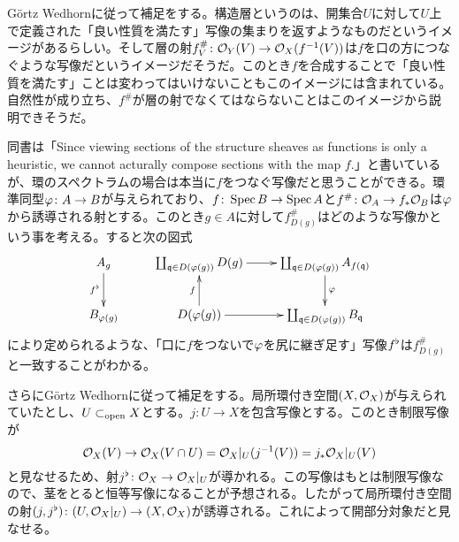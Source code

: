 \begin{rem}
  G\"{o}rtz Wedhorn\cite{GW}に従って補足をする。構造層というのは、開集合$U$に対して$U$上で定義された「良い性質を満たす」写像の集まりを返すようなものだというイメージがあるらしい。そして層の射$f^{\#}_V \colon \mathcal{O}_Y(V) \to \mathcal{O}_X(f^{-1}(V)) $は$f$を口の方につなぐような写像だというイメージだそうだ。このとき$f$を合成することで「良い性質を満たす」ことは変わってはいけないこともこのイメージには含まれている。自然性が成り立ち、$f^{\#}$が層の射でなくてはならないことはこのイメージから説明できそうだ。

  同書は「Since viewing sections of the structure sheaves as functions is only a heuristic, we cannot acturally compose sections with the map $f$.」と書いているが、環のスペクトラムの場合は本当に$f$をつなぐ写像だと思うことができる。環準同型${\varphi} \colon A \to B$が与えられており、$f \colon \operatorname{Spec} B \to \operatorname{Spec} A$と$f^{\#} \colon \mathcal{O}_A \to f_* \mathcal{O}_B$は${\varphi}$から誘導される射とする。このとき$g \in A$に対して$f^{\#}_{D(g)}$はどのような写像かという事を考える。すると次の図式
  \[
  \xymatrix{
  A_g \ar[d]_{f\fl} & \coprod_{\frakq \in D(\vp(g))} D(g) \ar[r]  &  \coprod_{\frakq \in D(\vp(g))} A_{f(\frakq)} \ar[d]^-{\vp} \\
B_{\vp(g)} & D(\vp(g)) \ar[r] \ar[u]^-f & \coprod_{\frakq \in D(\vp(g))} B_{\frakq}
  }
  \]
  により定められるような、「口に$f$をつないで${\varphi}$を尻に継ぎ足す」写像$f^{\flat}$は$f^{\#}_{D(g)} $と一致することがわかる。
\end{rem}

\begin{rem}
  さらにG\"{o}rtz Wedhorn\cite{GW}に従って補足をする。局所環付き空間$(X,\mathcal{O}_X)$が与えられていたとし、$U \subset_{\text{open}} X$とする。$j \colon U \to X$を包含写像とする。このとき制限写像が
  \[
  \mathcal{O}_X(V) \to \mathcal{O}_X(V \cap U) = \mathcal{O}_{X}|_U (j^{-1}(V)) = j_* \mathcal{O}_{X}|_U (V)
  \]
  と見なせるため、射$j^{\flat} \colon \mathcal{O}_X \to \mathcal{O}_{X}|_U$が導かれる。この写像はもとは制限写像なので、茎をとると恒等写像になることが予想される。したがって局所環付き空間の射$(j,j^{\flat}) \colon (U, \mathcal{O}_{X}|_U) \to (X,\mathcal{O}_X)$が誘導される。これによって開部分対象だと見なせる。
\end{rem}




